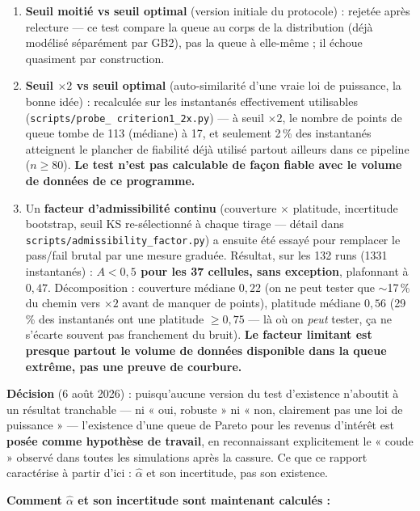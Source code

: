 \documentclass[11pt,a4paper]{article}
\begin{document}
\begin{enumerate}
\item \textbf{Seuil moitié vs seuil optimal} (version initiale du
  protocole) : rejetée après relecture --- ce test compare la queue au
  corps de la distribution (déjà modélisé séparément par GB2), pas la
  queue à elle-même ; il échoue quasiment par construction.
\item \textbf{Seuil $\times 2$ vs seuil optimal} (auto-similarité d'une
  vraie loi de puissance, la bonne idée) : recalculée sur les
  instantanés effectivement utilisables (\texttt{scripts/probe\_
  criterion1\_2x.py}) --- à seuil $\times 2$, le nombre de points de
  queue tombe de 113 (médiane) à 17, et seulement 2\,\% des instantanés
  atteignent le plancher de fiabilité déjà utilisé partout ailleurs dans
  ce pipeline ($n\geq 80$). \textbf{Le test n'est pas calculable de
  façon fiable avec le volume de données de ce programme.}
\item Un \textbf{facteur d'admissibilité continu} (couverture $\times$
  platitude, incertitude bootstrap, seuil KS re-sélectionné à chaque
  tirage --- détail dans \texttt{scripts/admissibility\_factor.py}) a
  ensuite été essayé pour remplacer le pass/fail brutal par une mesure
  graduée. Résultat, sur les 132 runs (1331 instantanés) :
  \textbf{$A<0{,}5$ pour les 37 cellules, sans exception}, plafonnant à
  $0{,}47$. Décomposition : couverture médiane $0{,}22$ (on ne peut
  tester que $\sim$17\,\% du chemin vers $\times 2$ avant de manquer de
  points), platitude médiane $0{,}56$ (29\,\% des instantanés ont une
  platitude $\geq 0{,}75$ --- là où on \emph{peut} tester, ça ne
  s'écarte souvent pas franchement du bruit). \textbf{Le facteur
  limitant est presque partout le volume de données disponible dans la
  queue extrême, pas une preuve de courbure.}
\end{enumerate}

\textbf{Décision} (6 août 2026) : puisqu'aucune version du test
d'existence n'aboutit à un résultat tranchable --- ni « oui, robuste »
ni « non, clairement pas une loi de puissance » --- l'existence d'une
queue de Pareto pour les revenus d'intérêt est \textbf{posée comme
hypothèse de travail}, en reconnaissant explicitement le « coude »
observé dans toutes les simulations après la cassure. Ce que ce rapport
caractérise à partir d'ici : $\hat\alpha$ et son incertitude, pas son
existence.

\textbf{Comment $\hat\alpha$ et son incertitude sont maintenant
calculés :}
\end{document}
